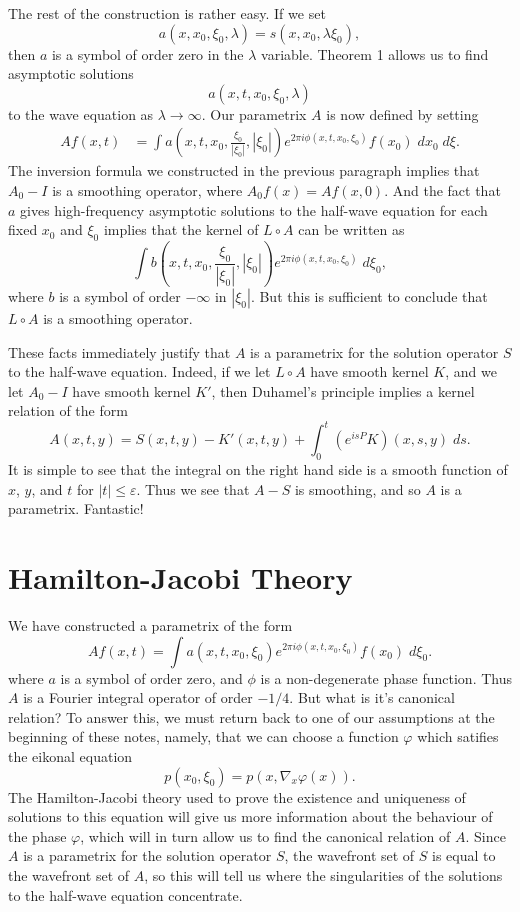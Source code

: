 \documentclass{article}
\theoremstyle{plain}
\theoremstyle{remark}
\theoremstyle{definition}
\begin{document}
The rest of the construction is rather easy. If we set
%
\[ a(x,x_0,\xi_0,\lambda) = s( x, x_0, \lambda \xi_0 ), \]
%
then $a$ is a symbol of order zero in the $\lambda$ variable. Theorem 1 allows us to find asymptotic solutions
%
\[ a(x,t,x_0,\xi_0,\lambda) \]
%
to the wave equation as $\lambda \to \infty$. Our parametrix $A$ is now defined by setting
%
\begin{align*}
	Af(x,t) &= \int a \left( x, t, x_0, \frac{\xi_0}{|\xi_0|} , |\xi_0| \right) e^{2 \pi i \phi(x,t,x_0,\xi_0)} f(x_0)\; dx_0\; d\xi.
\end{align*}
%
The inversion formula we constructed in the previous paragraph implies that $A_0 - I$ is a smoothing operator, where $A_0 f(x) = Af(x,0)$. And the fact that $a$ gives high-frequency asymptotic solutions to the half-wave equation for each fixed $x_0$ and $\xi_0$ implies that the kernel of $L \circ A$ can be written as
%
\[ \int b \left( x, t, x_0, \frac{\xi_0}{|\xi_0|} , |\xi_0| \right) e^{2 \pi i \phi(x,t,x_0,\xi_0)}\; d\xi_0, \]
%
where $b$ is a symbol of order $-\infty$ in $|\xi_0|$. But this is sufficient to conclude that $L \circ A$ is a smoothing operator.

These facts immediately justify that $A$ is a parametrix for the solution operator $S$ to the half-wave equation. Indeed, if we let $L \circ A$ have smooth kernel $K$, and we let $A_0 - I$ have smooth kernel $K'$, then Duhamel's principle implies a kernel relation of the form
%
\[ A(x,t,y) = S(x,t,y) - K'(x,t,y) + \int_0^t (e^{isP} K)(x,s,y)\; ds. \]
%
It is simple to see that the integral on the right hand side is a smooth function of $x$, $y$, and $t$ for $|t| \leq \varepsilon$. Thus we see that $A - S$ is smoothing, and so $A$ is a parametrix. Fantastic!

\section{Hamilton-Jacobi Theory}

We have constructed a parametrix of the form
%
\[ Af(x,t) = \int a(x,t,x_0,\xi_0) e^{2 \pi i \phi(x,t,x_0,\xi_0)} f(x_0)\; d\xi_0. \]
%
where $a$ is a symbol of order zero, and $\phi$ is a non-degenerate phase function. Thus $A$ is a Fourier integral operator of order $-1/4$. But what is it's canonical relation? To answer this, we must return back to one of our assumptions at the beginning of these notes, namely, that we can choose a function $\varphi$ which satifies the eikonal equation
%
\[ p(x_0,\xi_0) = p(x, \nabla_x \varphi(x)). \]
%
The Hamilton-Jacobi theory used to prove the existence and uniqueness of solutions to this equation will give us more information about the behaviour of the phase $\varphi$, which will in turn allow us to find the canonical relation of $A$. Since $A$ is a parametrix for the solution operator $S$, the wavefront set of $S$ is equal to the wavefront set of $A$, so this will tell us where the singularities of the solutions to the half-wave equation concentrate.
\end{document}
